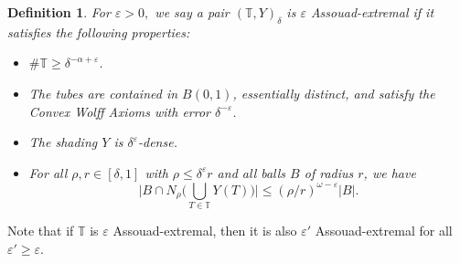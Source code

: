 \documentclass[letterpaper, reqno,11pt]{article}
\numberwithin{equation}{section}
\newcommand{\eps}{\varepsilon}
\newcommand{\tubes}{\mathbb{T}}
\numberwithin{thm}{section}
\newtheorem{defn}[thm]{Definition}
\theoremstyle{remark}
\begin{document}
\begin{defn}\label{epsAssouadExtremalDefn}
For $\eps>0,$ we say a pair $(\tubes,Y)_\delta$ is \emph{$\eps$ Assouad-extremal} if it satisfies the following properties:
\begin{itemize}
    \item[(i)] $\#\tubes \geq\delta^{-\alpha+\eps}$.
    \item[(ii)] The tubes are contained in $B(0,1)$, essentially distinct, and satisfy the Convex Wolff Axioms with error $\delta^{-\eps}$.
    \item[(iii)] The shading $Y$ is $\delta^{\eps}$-dense. 
    \item[(iv)] For all $\rho,r\in [\delta,1]$ with $\rho\leq\delta^{\eps}r$ and all balls $B$ of radius $r$, we have
    \begin{equation}\label{volumeBdNearExtremal}
        \Big| B \cap N_\rho\Big( \bigcup_{T\in\tubes}Y(T)\Big)\Big| \leq (\rho/r)^{\omega-\eps}|B|.
    \end{equation}
\end{itemize}
\end{defn}

Note that if $\tubes$ is $\eps$ Assouad-extremal, then it is also $\eps'$ Assouad-extremal for all $\eps'\geq\eps$.
\end{document}
